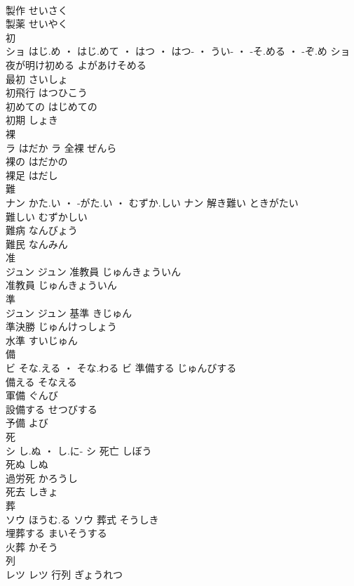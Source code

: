 \documentclass[8pt]{extreport}
\begin{document}
\begin{CJK}{UTF8}{min}
\\	製作	せいさく	
\\	製薬	せいやく	
\\	初	
\\	ショ	はじ.め ・ はじ.めて ・ はつ ・ はつ- ・ うい- ・ -そ.める ・ -ぞ.め	ショ	夜が明け初める	よがあけそめる	
\\	最初	さいしょ	
\\	初飛行	はつひこう	
\\	初めての	はじめての	
\\	初期	しょき	
\\	裸	
\\	ラ	はだか	ラ	全裸	ぜんら	
\\	裸の	はだかの	
\\	裸足	はだし	
\\	難	
\\	ナン	かた.い ・ -がた.い ・ むずか.しい	ナン	解き難い	ときがたい	
\\	難しい	むずかしい	
\\	難病	なんびょう	
\\	難民	なんみん	
\\	准	
\\	ジュン		ジュン	准教員	じゅんきょういん	
\\	准教員	じゅんきょういん	
\\	準	
\\	ジュン		ジュン	基準	きじゅん	
\\	準決勝	じゅんけっしょう	
\\	水準	すいじゅん	
\\	備	
\\	ビ	そな.える ・ そな.わる	ビ	準備する	じゅんびする	
\\	備える	そなえる	
\\	軍備	ぐんび	
\\	設備する	せつびする	
\\	予備	よび	
\\	死	
\\	シ	し.ぬ ・ し.に-	シ	死亡	しぼう	
\\	死ぬ	しぬ	
\\	過労死	かろうし	
\\	死去	しきょ	
\\	葬	
\\	ソウ	ほうむ.る	ソウ	葬式	そうしき	
\\	埋葬する	まいそうする	
\\	火葬	かそう	
\\	列	
\\	レツ		レツ	行列	ぎょうれつ	

\end{CJK}
\end{document}
